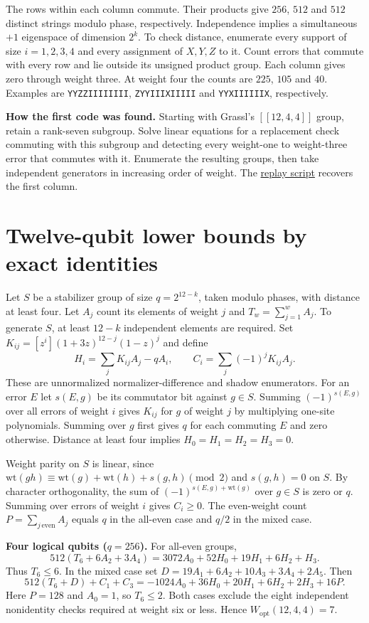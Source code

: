 \documentclass[11pt]{article}
\newcommand{\W}{W_{\mathrm{opt}}}
\begin{document}
The rows within each column commute. Their products give $256$, $512$ and $512$ distinct strings modulo phase, respectively. Independence implies a simultaneous $+1$ eigenspace of dimension $2^k$. To check distance, enumerate every support of size $i=1,2,3,4$ and every assignment of $X,Y,Z$ to it. Count errors that commute with every row and lie outside its unsigned product group. Each column gives zero through weight three. At weight four the counts are $225$, $105$ and $40$. Examples are \texttt{YYZZIIIIIIII}, \texttt{ZYYIIIXIIIII} and \texttt{YYXIIIIIIX}, respectively.

\textbf{How the first code was found.} Starting with Grassl's $[[12,4,4]]$ group, retain a rank-seven subgroup. Solve linear equations for a replacement check commuting with this subgroup and detecting every weight-one to weight-three error that commutes with it. Enumerate the resulting groups, then take independent generators in increasing order of weight. The \href{https://github.com/shunyaekam/oo-research/blob/research/checks/small_qec/neighbor_replay.py}{replay script} recovers the first column.
\section*{Twelve-qubit lower bounds by exact identities}
Let $S$ be a stabilizer group of size $q=2^{12-k}$, taken modulo phases, with distance at least four. Let $A_j$ count its elements of weight $j$ and $T_w=\sum_{j=1}^{w} A_j$. To generate $S$, at least $12-k$ independent elements are required. Set $K_{ij}=[z^i](1+3z)^{12-j}(1-z)^j$ and define
\[
 H_i=\sum_jK_{ij}A_j-qA_i,\qquad C_i=\sum_j(-1)^jK_{ij}A_j.
\]
These are unnormalized normalizer-difference and shadow enumerators. For an error $E$ let $s(E,g)$ be its commutator bit against $g\in S$. Summing $(-1)^{s(E,g)}$ over all errors of weight $i$ gives $K_{ij}$ for $g$ of weight $j$ by multiplying one-site polynomials. Summing over $g$ first gives $q$ for each commuting $E$ and zero otherwise. Distance at least four implies $H_0=H_1=H_2=H_3=0$.

Weight parity on $S$ is linear, since $\mathrm{wt}(gh)\equiv\mathrm{wt}(g)+\mathrm{wt}(h)+s(g,h)\pmod2$ and $s(g,h)=0$ on $S$. By character orthogonality, the sum of $(-1)^{s(E,g)+\mathrm{wt}(g)}$ over $g\in S$ is zero or $q$. Summing over errors of weight $i$ gives $C_i\ge0$. The even-weight count $P=\sum_{j\,\mathrm{even}}A_j$ equals $q$ in the all-even case and $q/2$ in the mixed case.

\textbf{Four logical qubits ($q=256$).} For all-even groups,
\[
512(T_6+6A_2+3A_4)=3072 A_0+52H_0+19H_1+6H_2+H_3.
\]
Thus $T_6\le6$. In the mixed case set $D=19A_1+6A_2+10A_3+3A_4+2A_5$. Then
\[
512(T_6+D)+C_1+C_3=-1024 A_0+36H_0+20H_1+6H_2+2H_3+16P.
\]
Here $P=128$ and $A_0=1$, so $T_6\le2$. Both cases exclude the eight independent nonidentity checks required at weight six or less. Hence $\W(12,4,4)=7$.
\end{document}
